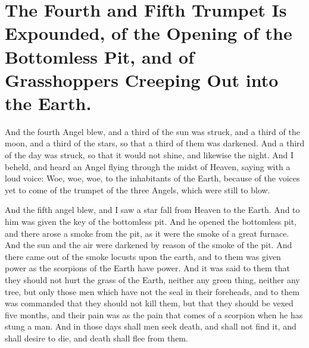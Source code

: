 \chapter[Sermon 39. The Fourth and Fifth Trumpet Is Expounded, of the Opening of the Bottomless Pit, and of Grasshoppers Creeping Out into the Earth.]{The Fourth and Fifth Trumpet Is Expounded, of the Opening of the Bottomless Pit, and of Grasshoppers Creeping Out into the Earth.}
\label{sermon:039}

And the fourth Angel blew, and a third of the sun was struck, and a third of the moon, and a third of the stars, so that a third of them was darkened. And a third of the day was struck, so that it would not shine, and likewise the night. And I beheld, and heard an Angel flying through the midst of Heaven, saying with a loud voice: Woe, woe, woe, to the inhabitants of the Earth, because of the voices yet to come of the trumpet of the three Angels, which were still to blow.

And the fifth angel blew, and I saw a star fall from Heaven to the Earth. And to him was given the key of the bottomless pit. And he opened the bottomless pit, and there arose a smoke from the pit, as it were the smoke of a great furnace. And the sun and the air were darkened by reason of the smoke of the pit. And there came out of the smoke locusts upon the earth, and to them was given power as the scorpions of the Earth have power. And it was said to them that they should not hurt the grass of the Earth, neither any green thing, neither any tree, but only those men which have not the seal in their foreheads, and to them was commanded that they should not kill them, but that they should be vexed five months, and their pain was as the pain that comes of a scorpion when he has stung a man. And in those days shall men seek death, and shall not find it, and shall desire to die, and death shall flee from them.


